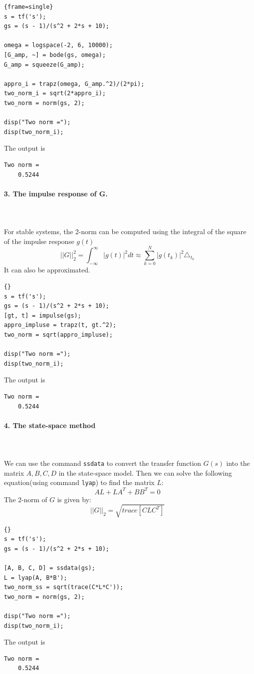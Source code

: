 \documentclass{article}
\begin{document}
\begin{lstlisting}{frame=single}
s = tf('s');
gs = (s - 1)/(s^2 + 2*s + 10);

omega = logspace(-2, 6, 10000);
[G_amp, ~] = bode(gs, omega);
G_amp = squeeze(G_amp);

appro_i = trapz(omega, G_amp.^2)/(2*pi);
two_norm_i = sqrt(2*appro_i);
two_norm = norm(gs, 2);

disp("Two norm =");
disp(two_norm_i);
\end{lstlisting}
The output is 
\begin{lstlisting}[numbers=none]
Two norm =
    0.5244
\end{lstlisting}

\paragraph{3. The impulse response of G.}~\\~\\
For stable systems, the 2-norm can be computed using the integral of the square of the impulse response $g(t)$
\[||G||^2_2=\int^{\infty}_{-\infty}|g(t)|^2dt \approx \sum^{N}_{k=0}|g(t_k)|^2\triangle_{t_k}\]
It can also be approximated.
\begin{lstlisting}{}
s = tf('s');
gs = (s - 1)/(s^2 + 2*s + 10);
[gt, t] = impulse(gs);
appro_impluse = trapz(t, gt.^2);
two_norm = sqrt(appro_impluse);

disp("Two norm =");
disp(two_norm_i);
\end{lstlisting}
The output is 
\begin{lstlisting}[numbers=none]
Two norm =
    0.5244
\end{lstlisting}

\paragraph{4. The state-space method}~\\~\\
We can use the command \verb|ssdata| to convert the transfer function $G(s)$ into the matrix $A, B, C, D$ in the state-space model. Then we can solve the following equation(using command \verb|lyap|) to find the matrix $L$:
$$AL+LA^T+BB^T=0$$
The 2-norm of $G$ is given by:
$$||G||_2=\sqrt{trace[CLC^T]}$$
\begin{lstlisting}{}
s = tf('s');
gs = (s - 1)/(s^2 + 2*s + 10);

[A, B, C, D] = ssdata(gs);
L = lyap(A, B*B');
two_norm_ss = sqrt(trace(C*L*C'));
two_norm = norm(gs, 2);

disp("Two norm =");
disp(two_norm_i);
\end{lstlisting}
The output is 
\begin{lstlisting}[numbers=none]
Two norm =
    0.5244
\end{lstlisting}
\end{document}
